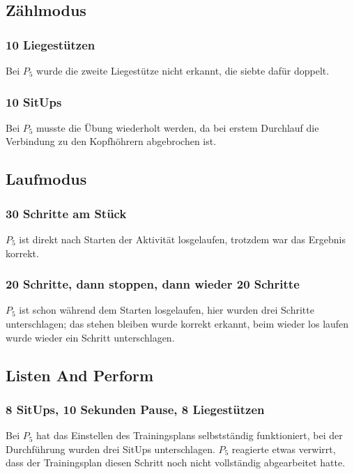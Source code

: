 \documentclass[a4paper,12pt]{article}
\begin{document}
\subsection{Zählmodus}
\subsubsection{10 Liegestützen}
Bei $P_5$ wurde die zweite Liegestütze nicht erkannt, die siebte dafür doppelt.
\subsubsection{10 SitUps}
Bei $P_5$ musste die Übung wiederholt werden, da bei erstem Durchlauf die Verbindung zu den Kopfhöhrern abgebrochen ist.
\subsection{Laufmodus}
\subsubsection{30 Schritte am Stück}
$P_5$ ist direkt nach Starten der Aktivität losgelaufen, trotzdem war das Ergebnis korrekt.
\subsubsection{20 Schritte, dann stoppen, dann wieder 20 Schritte}
$P_5$ ist schon während dem Starten losgelaufen, hier wurden drei Schritte unterschlagen; das stehen bleiben wurde korrekt erkannt, beim wieder los laufen wurde wieder ein Schritt unterschlagen.
\subsection{Listen And Perform}
\subsubsection{8 SitUps, 10 Sekunden Pause, 8 Liegestützen}
Bei $P_5$ hat das Einstellen des Trainingsplans selbstständig funktioniert, bei der Durchführung wurden drei SitUps unterschlagen. $P_5$ reagierte etwas verwirrt, dass der Trainingsplan diesen Schritt noch nicht vollständig abgearbeitet hatte.
\end{document}
